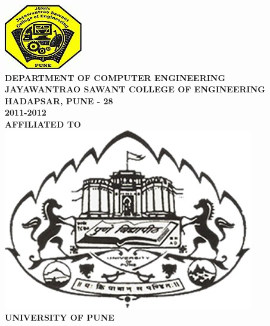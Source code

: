 \begin{center}
\includegraphics[scale=0.5]{project/images/jscoe_logo}\\
\large{\textbf{DEPARTMENT OF COMPUTER ENGINEERING}}\\
\Large{\textbf{JAYAWANTRAO SAWANT COLLEGE OF ENGINEERING}}\\
\large{\textbf{HADAPSAR, PUNE - 28}}
\large{\textbf{\\2011-2012}}\\[0.5cm]
\Large{\textbf{AFFILIATED TO}}\\[0.5cm]
\includegraphics[scale=5.0]{project/images/uop-logo}\\
\LARGE{\textbf{UNIVERSITY OF PUNE}}
\newpage

\end{center}


